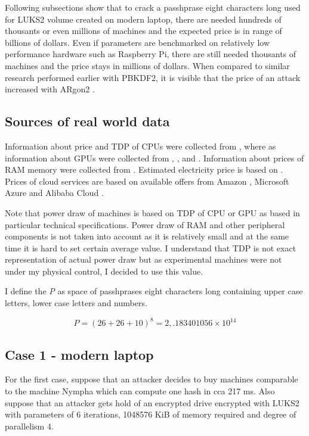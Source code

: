 \documentclass[nolof]{fithesis3}
\begin{document}
Following subsections show that to crack a passhprase eight characters long used for LUKS2 volume created on modern laptop, there are needed hundreds of thousants or even millions of machines and the expected price is in range of billions of dollars. Even if parameters are benchmarked on relatively low performance hardware such as Raspberry Pi, there are still needed thousants of machines and the price stays in millions of dollars. When compared to similar research performed earlier with PBKDF2, it is visible that the price of an attack increased with ARgon2 \parencite{pbkdfresearch}.

\subsection{Sources of real world data}
Information about price and TDP of CPUs were collected from \parencite{intelspecs}, where as information about GPUs were collected from \parencite{teslak20}, \parencite{teslap100}, \parencite{geforceprice} and \parencite{geforce}. Information about prices of RAM memory were collected from \parencite{memoryprice}. Estimated electricity price is based on \parencite{electricity}. Prices of cloud services are based on available offers from Amazon \parencite{amazon} \parencite{amazoncalc}, Microsoft Azure \parencite{azure} and Alibaba Cloud \parencite{alibaba}.

Note that power draw of machines is based on TDP of CPU or GPU as based in particular technical specifications. Power draw of RAM and other peripheral components is not taken into account as it is relatively small and at the same time it is hard to set certain average value. I understand that TDP is not exact representation of actual power draw but as experimental machines were not under my physical control, I decided to use this value.

I define the \emph{P} as space of passhprases eight characters long containing upper case letters, lower case letters and numbers.

$$P = (26 + 26 + 10)^8 = 2,.183401056 \times 10^{14}$$

\subsection{Case 1 - modern laptop}
For the first case, suppose that an attacker decides to buy machines comparable to the machine Nympha which can compute one hash in cca 217 ms. Also suppose that an attacker gets hold of an encrypted drive encrypted with LUKS2 with parameters of 6 iterations, 1048576 KiB of memory required and degree of parallelism 4.
\end{document}
